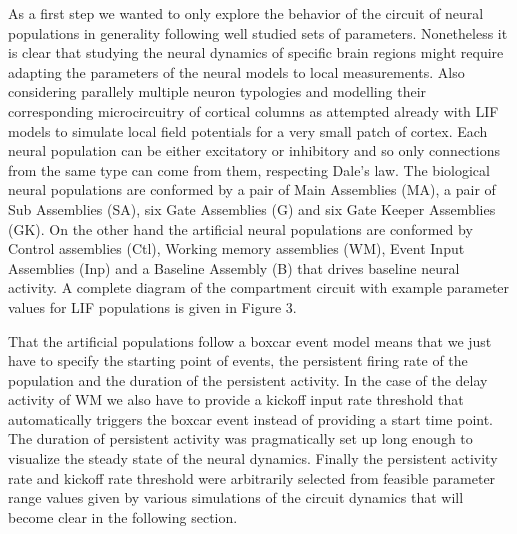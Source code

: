 \documentclass[10pt]{article}
\begin{document}
As a first step we wanted to only explore the behavior of the circuit of neural populations in generality following well studied sets of parameters.
Nonetheless it is clear that studying the neural dynamics of specific brain regions might require adapting the parameters of the neural models to local measurements.
Also considering parallely multiple neuron typologies and modelling their corresponding microcircuitry of cortical columns as attempted already with LIF models to simulate local field potentials for a very small patch of cortex\cite{Mazzoni_2015,Hagen_2015}.
Each neural population can be either excitatory or inhibitory and so only connections from the same type can come from them, respecting Dale's law.
The biological neural populations are conformed by a pair of Main Assemblies (MA), a pair of Sub Assemblies (SA), six Gate Assemblies (G) and six Gate Keeper Assemblies (GK).
On the other hand the artificial neural populations are conformed by Control assemblies (Ctl), Working memory assemblies (WM), Event Input Assemblies (Inp) and a Baseline Assembly (B) that drives baseline neural activity.
A complete diagram of the compartment circuit with example parameter values for LIF populations is given in Figure 3.

That the artificial populations follow a boxcar event model means that we just have to specify the starting point of events, the persistent firing rate of the population and the duration of the persistent activity.
In the case of the delay activity of WM we also have to provide a kickoff input rate threshold that automatically triggers the boxcar event instead of providing a start time point.
The duration of persistent activity was pragmatically set up long enough to visualize the steady state of the neural dynamics.
Finally the persistent activity rate and kickoff rate threshold were arbitrarily selected from feasible parameter range values given by various simulations of the circuit dynamics that will become clear in the following section.
\end{document}
